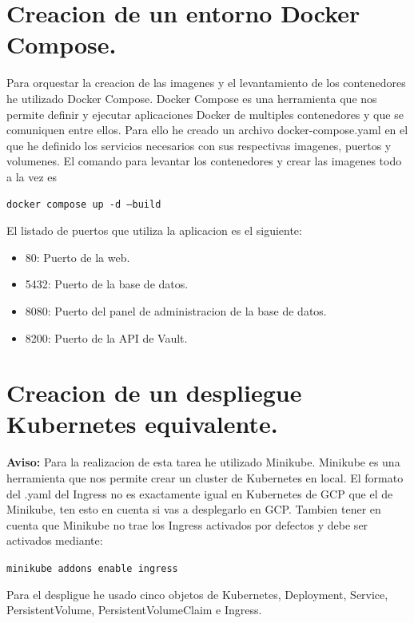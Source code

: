 \documentclass{report}
\begin{document}
        \section{Creacion de un entorno Docker Compose.}
            Para orquestar la creacion de las imagenes y el levantamiento de los contenedores he utilizado Docker Compose.
            Docker Compose es una herramienta que nos permite definir y ejecutar aplicaciones Docker de multiples contenedores y que se comuniquen entre ellos.
            Para ello he creado un archivo docker-compose.yaml en el que he definido los servicios necesarios con sus respectivas imagenes, puertos y volumenes.
            El comando para levantar los contenedores y crear las imagenes todo a la vez es
            \begin{center}
                \texttt{docker compose up -d --build}
            \end{center}
            El listado de puertos que utiliza la aplicacion es el siguiente:
            \begin{itemize}
                \item 80: Puerto de la web.
                \item 5432: Puerto de la base de datos.
                \item 8080: Puerto del panel de administracion de la base de datos.
                \item 8200: Puerto de la API de Vault.
            \end{itemize}

        \clearpage
        \section{Creacion de un despliegue Kubernetes equivalente.}
            \textbf{Aviso:} Para la realizacion de esta tarea he utilizado Minikube. Minikube es una herramienta que nos permite crear un cluster de Kubernetes en local. El formato del .yaml del Ingress no es exactamente igual en Kubernetes de GCP que el de Minikube, ten esto en cuenta si vas a desplegarlo en GCP. Tambien tener en cuenta que Minikube no trae los Ingress activados por defectos y debe ser activados mediante:
            \begin{center}
                \texttt{minikube addons enable ingress}
            \end{center}
            Para el despligue he usado cinco objetos de Kubernetes, Deployment, Service, PersistentVolume, PersistentVolumeClaim e Ingress.\\
\end{document}
